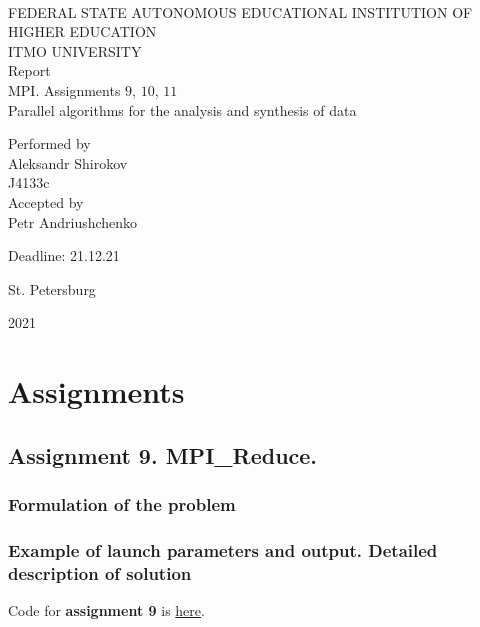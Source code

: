 \documentclass[%
12pt, %
final, %
oneside, %
onecolumn, %
centertags]{article} %
\theoremstyle{plain}
\theoremstyle{definition}
\theoremstyle{remark}
\begin{document}
	\begin{titlepage} 
		\begin{center}
		\textbf{}\\[2.0cm]
		\LARGE FEDERAL STATE AUTONOMOUS EDUCATIONAL INSTITUTION OF HIGHER EDUCATION \\[0.5cm]
		\Large ITMO UNIVERSITY \\[3cm]
		\LARGE Report\\
		\Large MPI. Assignments $9$, $10$, $11$ \\
		\Large Parallel algorithms for the analysis and synthesis of data \\[4cm]


		\begin{flushright}
		Performed by\\
		Aleksandr Shirokov\\
		J4133c\\
		Accepted by\\
		Petr Andriushchenko

		Deadline: 21.12.21
		\end{flushright}

		\vfill 

		{\Large {St. Petersburg}} \par
		{\Large {2021}}
		\end{center} 
	\end{titlepage}

\tableofcontents
\newpage


\section{Assignments}

\subsection{Assignment 9. MPI\_Reduce.}

\subsubsection{Formulation of the problem}

\subsubsection{Example of launch parameters and output. Detailed description of solution}

Code for \textbf{assignment 9} is \href{https:\//github.com/aptmess/parallel_algorithms/blob/master/HT/hw_mpi/Assignment8.c}{here}.
\end{document}
